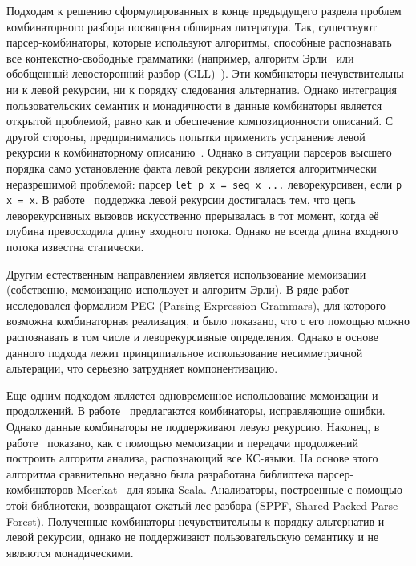 \documentclass[conference]{IEEEtran}
\begin{document}
Подходам к решению сформулированных в конце предыдущего раздела проблем комбинаторного разбора посвящена обширная литература. Так, существуют парсер-комбинаторы,
которые используют алгоритмы, способные распознавать все контекстно-свободные грамматики (например, алгоритм Эрли~\cite{earleycomb} или обобщенный левосторонний разбор
(GLL)~\cite{GLLcomb}). Эти комбинаторы нечувствительны ни к левой рекурсии, ни к порядку следования альтернатив. Однако интеграция пользовательских семантик и монадичности
в данные комбинаторы является открытой проблемой, равно как и обеспечение композиционности описаний. С другой стороны, предпринимались попытки применить устранение
левой рекурсии к комбинаторному описанию~\cite{leftcorner}. Однако в ситуации парсеров высшего порядка само установление факта левой рекурсии является алгоритмически
неразрешимой проблемой: парсер \lstinline|let p x = seq x ...| леворекурсивен, если \lstinline|p x = x|. В работе~\cite{frost} поддержка левой рекурсии достигалась тем,
что цепь леворекурсивных вызовов искусственно прерывалась в тот момент, когда её глубина превосходила длину входного потока. Однако не всегда длина входного
потока известна статически.

Другим естественным направлением является использование мемоизации (собственно, мемоизацию использует и алгоритм Эрли). В ряде работ~\cite{tratt,warth,ford2002packrat,ford2004parsing}
исследовался формализм PEG (Parsing Expression Grammars), для которого возможна комбинаторная реализация, и было показано, что с его помощью можно распознавать
в том числе и леворекурсивные определения. Однако в основе данного подхода лежит принципиальное использование несимметричной альтерации, что серьезно затрудняет
компонентизацию.

Еще одним подходом является одновременное использование мемоизации и продолжений. В работе~\cite{swierstra2001combinator} предлагаются комбинаторы, исправляющие
ошибки. Однако данные комбинаторы не поддерживают левую рекурсию. Наконец, в работе~\cite{memo} показано, как с помощью мемоизации и передачи продолжений построить
алгоритм анализа, распознающий все КС-языки. На основе этого алгоритма сравнительно недавно была разработана библиотека парсер-комбинаторов Meerkat~\cite{meerkat} для языка Scala.
Анализаторы, построенные с помощью этой библиотеки, возвращают сжатый лес разбора (SPPF, Shared Packed Parse Forest). Полученные комбинаторы нечувствительны к порядку
альтернатив и левой рекурсии, однако не поддерживают пользовательскую семантику и не являются монадическими.
\end{document}
